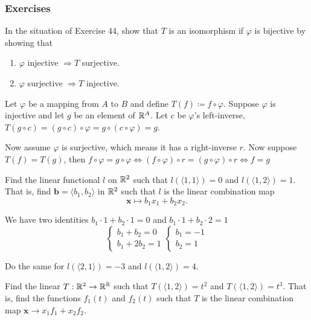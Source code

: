 \documentclass[../../main.tex]{subfiles}
\begin{document}
\subsubsection{Exercises}
\begin{problem}
	In the situation of Exercise 44, show that $T$ is an isomorphism if $\varphi$ is bijective by showing that
	\begin{enumerate}
		\item $\varphi$ injective $\Rightarrow T$ surjective.
		\item $\varphi$ surjective $\Rightarrow T$ injective.
	\end{enumerate}
\end{problem}
\begin{solution}
	Let $\varphi$ be a mapping from $A$ to $B$ and define $T(f) \coloneqq f \circ \varphi$. Suppose $\varphi$ is injective and let $g$ be an element of $\mathbb{R}^A$. Let $c$ be $\varphi$'s left-inverse, $T(g \circ c) = (g \circ c) \circ \varphi = g \circ (c \circ \varphi) = g$. \par
	Now assume $\varphi$ is surjective, which means it has a right-inverse $r$. Now suppose $T(f) = T(g)$, then $f \circ \varphi = g \circ \varphi \Leftrightarrow (f \circ \varphi) \circ r = (g \circ \varphi) \circ r \Leftrightarrow f = g$ 
\end{solution}
\begin{problem}
	Find the linear functional $l$ on $\mathbb{R}^2$ such that $l(\langle 1, 1 \rangle) = 0$ and $l(\langle 1, 2 \rangle ) = 1$. That is, find $\bm b = \langle b_1, b_2 \rangle$ in $\mathbb{R}^2$ such that $l$ is the linear combination map 
	\[
		\bm x \mapsto b_1x_1 + b_2x_2.
\]
\end{problem}
\begin{solution}
	We have two identities $b_1 \cdot 1 + b_2 \cdot 1 = 0$ and $b_1 \cdot 1 + b_2 \cdot 2 = 1$ 
	\[
	\begin{cases}
		b_1 + b_2 = 0 \\
		b_1 + 2b_2 = 1
	\end{cases}
	\begin{cases}
		b_1  = -1 \\
		b_2 = 1
	\end{cases}
\]
\end{solution}
\begin{problem}
	Do the same for $l(\langle 2, 1 \rangle) = -3$ and $l(\langle 1, 2 \rangle) = 4$.
\end{problem}
\begin{problem}
	Find the linear $T: \mathbb{R}^2 \to \mathbb{R}^{\mathbb{R}}$ such that $T(\langle 1, 2 \rangle) = t^2$ and $T(\langle 1, 2 \rangle) = t^3$. That is, find the functions $f_1(t)$ and $f_2(t)$ such that $T$ is the linear combination map $\bm x \to x_1 f_1 + x_2 f_2$.	
\end{problem}
\end{document}
